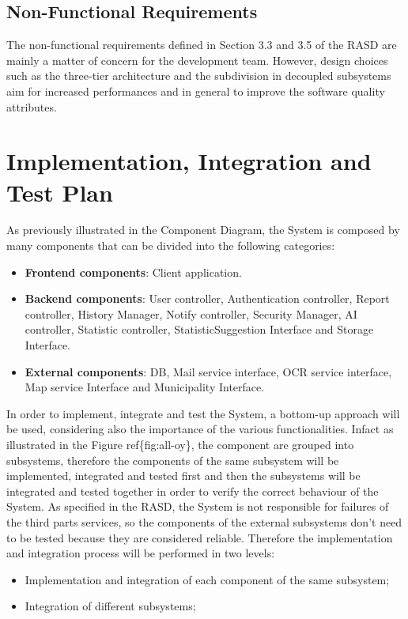 \documentclass{report}
\begin{document}
\section{Non-Functional Requirements}
The non-functional requirements defined in Section 3.3 and 3.5 of the RASD are mainly a matter of concern for the development team. However, design choices such as the three-tier architecture and the subdivision in decoupled subsystems aim for increased performances and in general to improve the software quality attributes.

\chapter{Implementation, Integration and Test Plan}
As previously illustrated in the Component Diagram, the System is composed by many components that can be divided into the following categories:
\begin{itemize}
\item \textbf{Frontend components}: Client application.
\item \textbf{Backend components}: User controller, Authentication controller, Report controller, History Manager, Notify controller, Security Manager, AI controller, Statistic controller, StatisticSuggestion Interface and Storage Interface.
\item \textbf{External components}: DB, Mail service interface, OCR service interface, Map service Interface and Municipality Interface.
\end{itemize}
In order to implement, integrate and test the System, a bottom-up approach will be used, considering also the importance of the various functionalities. Infact as illustrated in the Figure ref\{fig:all-oy\}, the component are grouped into subsystems, therefore the components of the same subsystem will be implemented, integrated and tested first and then the subsystems will be integrated and tested together in order to verify the correct behaviour of the System. As specified in the RASD, the System is not responsible for failures of the third parts services, so the components of the external subsystems don't need to be tested because they are considered reliable. Therefore the implementation and integration process will be performed in two levels:
\begin{itemize}
\item Implementation and integration of each component of the same subsystem;
\item Integration of different subsystems;
\end{itemize}
\end{document}
